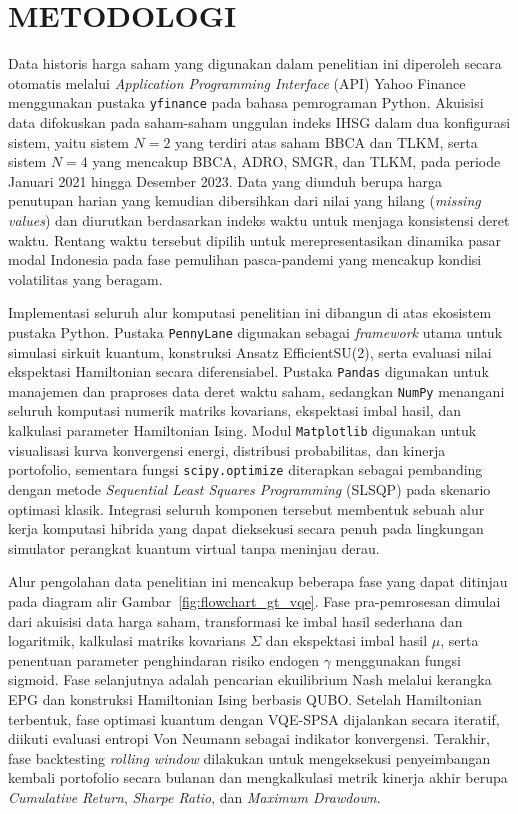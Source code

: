 \section{METODOLOGI}

Data historis harga saham yang digunakan dalam penelitian ini diperoleh secara otomatis melalui \textit{Application Programming Interface} (API) Yahoo Finance menggunakan pustaka \texttt{yfinance} pada bahasa pemrograman Python. Akuisisi data difokuskan pada saham-saham unggulan indeks IHSG dalam dua konfigurasi sistem, yaitu sistem $N=2$ yang terdiri atas saham BBCA dan TLKM, serta sistem $N=4$ yang mencakup BBCA, ADRO, SMGR, dan TLKM, pada periode Januari 2021 hingga Desember 2023. Data yang diunduh berupa harga penutupan harian yang kemudian dibersihkan dari nilai yang hilang (\textit{missing values}) dan diurutkan berdasarkan indeks waktu untuk menjaga konsistensi deret waktu. Rentang waktu tersebut dipilih untuk merepresentasikan dinamika pasar modal Indonesia pada fase pemulihan pasca-pandemi yang mencakup kondisi volatilitas yang beragam.

Implementasi seluruh alur komputasi penelitian ini dibangun di atas ekosistem pustaka Python. Pustaka \texttt{PennyLane} digunakan sebagai \textit{framework} utama untuk simulasi sirkuit kuantum, konstruksi Ansatz EfficientSU(2), serta evaluasi nilai ekspektasi Hamiltonian secara diferensiabel. Pustaka \texttt{Pandas} digunakan untuk manajemen dan praproses data deret waktu saham, sedangkan \texttt{NumPy} menangani seluruh komputasi numerik matriks kovarians, ekspektasi imbal hasil, dan kalkulasi parameter Hamiltonian Ising. Modul \texttt{Matplotlib} digunakan untuk visualisasi kurva konvergensi energi, distribusi probabilitas, dan kinerja portofolio, sementara fungsi \texttt{scipy.optimize} diterapkan sebagai pembanding dengan metode \textit{Sequential Least Squares Programming} (SLSQP) pada skenario optimasi klasik. Integrasi seluruh komponen tersebut membentuk sebuah alur kerja komputasi hibrida yang dapat dieksekusi secara penuh pada lingkungan simulator perangkat kuantum virtual tanpa meninjau derau.

Alur pengolahan data penelitian ini mencakup beberapa fase yang dapat ditinjau pada diagram alir Gambar~\ref{fig:flowchart_gt_vqe}. Fase pra-pemrosesan dimulai dari akuisisi data harga saham, transformasi ke imbal hasil sederhana dan logaritmik, kalkulasi matriks kovarians $\Sigma$ dan ekspektasi imbal hasil $\mu$, serta penentuan parameter penghindaran risiko endogen $\gamma$ menggunakan fungsi sigmoid. Fase selanjutnya adalah pencarian ekuilibrium Nash melalui kerangka EPG dan konstruksi Hamiltonian Ising berbasis QUBO. Setelah Hamiltonian terbentuk, fase optimasi kuantum dengan VQE-SPSA dijalankan secara iteratif, diikuti evaluasi entropi Von Neumann sebagai indikator konvergensi. Terakhir, fase backtesting \textit{rolling window} dilakukan untuk mengeksekusi penyeimbangan kembali portofolio secara bulanan dan mengkalkulasi metrik kinerja akhir berupa \textit{Cumulative Return}, \textit{Sharpe Ratio}, dan \textit{Maximum Drawdown}.

